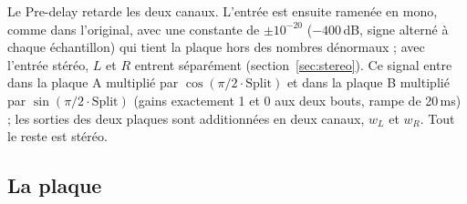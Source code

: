 \documentclass[a4paper,11pt]{article}
\newcommand{\dB}{\,dB}
\begin{document}
Le Pre-delay retarde les deux canaux. L'entrée est ensuite ramenée en mono, comme dans
l'original, avec une constante de $\pm10^{-20}$ ($-400$\dB, signe alterné à chaque échantillon)
qui tient la plaque hors des nombres dénormaux ; avec l'entrée stéréo, $L$ et $R$ entrent
séparément (section~\ref{sec:stereo}). Ce signal entre dans la plaque A multiplié par
$\cos(\pi/2 \cdot \mathrm{Split})$ et dans la plaque B multiplié par $\sin(\pi/2 \cdot
\mathrm{Split})$ (gains exactement 1 et 0 aux deux bouts, rampe de 20\,ms) ; les sorties des deux
plaques sont additionnées en deux canaux, $w_L$ et $w_R$. Tout le reste est stéréo.

\subsection{La plaque}\label{sec:plaque}
\end{document}
